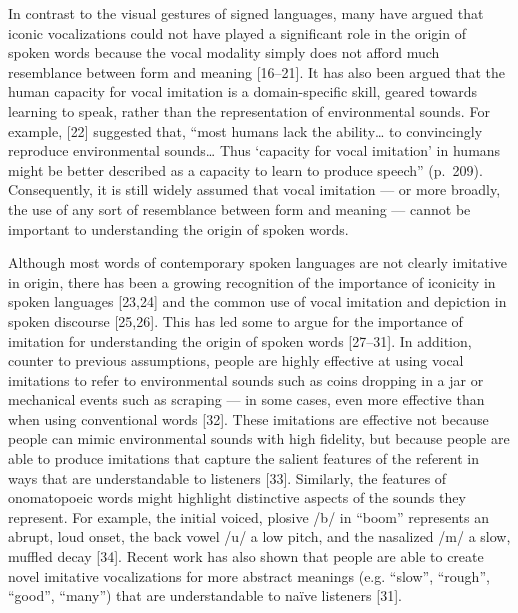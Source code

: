 \documentclass[english,floatsintext,man]{apa6}
\theoremstyle{definition}
\theoremstyle{definition}
\theoremstyle{definition}
\theoremstyle{remark}
\begin{document}
In contrast to the visual gestures of signed languages, many have argued
that iconic vocalizations could not have played a significant role in
the origin of spoken words because the vocal modality simply does not
afford much resemblance between form and meaning {[}16--21{]}. It has
also been argued that the human capacity for vocal imitation is a
domain-specific skill, geared towards learning to speak, rather than the
representation of environmental sounds. For example, {[}22{]} suggested
that, \enquote{most humans lack the ability\ldots{} to convincingly
reproduce environmental sounds\ldots{} Thus \enquote{capacity for vocal
imitation} in humans might be better described as a capacity to learn to
produce speech} (p.~209). Consequently, it is still widely assumed that
vocal imitation --- or more broadly, the use of any sort of resemblance
between form and meaning --- cannot be important to understanding the
origin of spoken words.

Although most words of contemporary spoken languages are not clearly
imitative in origin, there has been a growing recognition of the
importance of iconicity in spoken languages {[}23,24{]} and the common
use of vocal imitation and depiction in spoken discourse {[}25,26{]}.
This has led some to argue for the importance of imitation for
understanding the origin of spoken words {[}27--31{]}. In addition,
counter to previous assumptions, people are highly effective at using
vocal imitations to refer to environmental sounds such as coins dropping
in a jar or mechanical events such as scraping --- in some cases, even
more effective than when using conventional words {[}32{]}. These
imitations are effective not because people can mimic environmental
sounds with high fidelity, but because people are able to produce
imitations that capture the salient features of the referent in ways
that are understandable to listeners {[}33{]}. Similarly, the features
of onomatopoeic words might highlight distinctive aspects of the sounds
they represent. For example, the initial voiced, plosive /b/ in
\enquote{boom} represents an abrupt, loud onset, the back vowel /u/ a
low pitch, and the nasalized /m/ a slow, muffled decay {[}34{]}. Recent
work has also shown that people are able to create novel imitative
vocalizations for more abstract meanings (e.g. \enquote{slow},
\enquote{rough}, \enquote{good}, \enquote{many}) that are understandable
to naïve listeners {[}31{]}.
\end{document}
